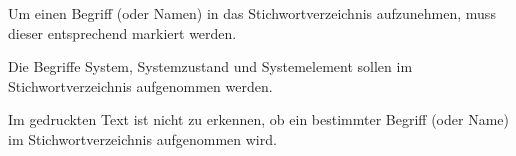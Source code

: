 
Um einen Begriff (oder Namen) in das Stichwortverzeichnis aufzunehmen, muss dieser entsprechend markiert werden.

\bigskip 

Die Begriffe System, Systemzustand und Systemelement sollen im Stichwortverzeichnis aufgenommen werden. 

\bigskip 

Im gedruckten Text ist nicht zu erkennen, ob ein bestimmter Begriff (oder Name) im Stichwortverzeichnis aufgenommen wird.
